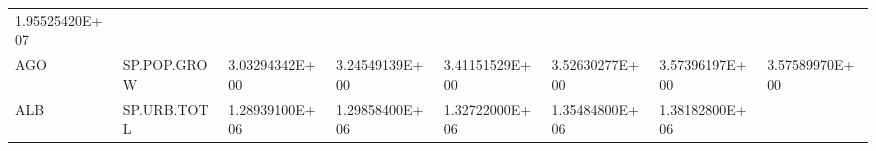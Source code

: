 \documentclass[]{article}
\begin{document}
\begin{longtable}[]{@{}llllllll@{}}
\begin{minipage}[t]{0.11\columnwidth}
1.95525420E+07\strut
\end{minipage}\tabularnewline
\begin{minipage}[t]{0.06\columnwidth}\raggedright
AGO\strut
\end{minipage} & \begin{minipage}[t]{0.08\columnwidth}\raggedright
SP.POP.GROW\strut
\end{minipage} & \begin{minipage}[t]{0.11\columnwidth}\raggedright
3.03294342E+00\strut
\end{minipage} & \begin{minipage}[t]{0.11\columnwidth}\raggedright
3.24549139E+00\strut
\end{minipage} & \begin{minipage}[t]{0.11\columnwidth}\raggedright
3.41151529E+00\strut
\end{minipage} & \begin{minipage}[t]{0.11\columnwidth}\raggedright
3.52630277E+00\strut
\end{minipage} & \begin{minipage}[t]{0.11\columnwidth}\raggedright
3.57396197E+00\strut
\end{minipage} & \begin{minipage}[t]{0.11\columnwidth}\raggedright
3.57589970E+00\strut
\end{minipage}\tabularnewline
\begin{minipage}[t]{0.06\columnwidth}\raggedright
ALB\strut
\end{minipage} & \begin{minipage}[t]{0.08\columnwidth}\raggedright
SP.URB.TOTL\strut
\end{minipage} & \begin{minipage}[t]{0.11\columnwidth}\raggedright
1.28939100E+06\strut
\end{minipage} & \begin{minipage}[t]{0.11\columnwidth}\raggedright
1.29858400E+06\strut
\end{minipage} & \begin{minipage}[t]{0.11\columnwidth}\raggedright
1.32722000E+06\strut
\end{minipage} & \begin{minipage}[t]{0.11\columnwidth}\raggedright
1.35484800E+06\strut
\end{minipage} & \begin{minipage}[t]{0.11\columnwidth}\raggedright
1.38182800E+06\strut
\end{minipage} & \begin{minipage}[t]{0.11\columnwidth}\raggedright

\end{minipage}
\end{longtable}
\end{document}

